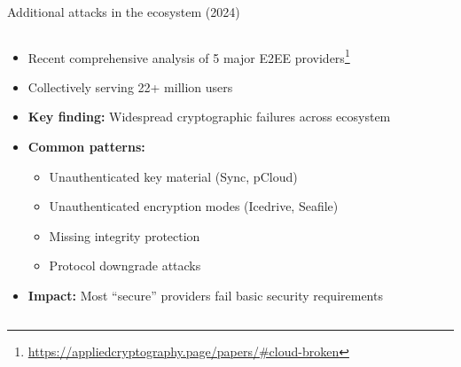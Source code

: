 \documentclass[aspectratio=169, lualatex, handout]{beamer}
\begin{document}
\begin{frame}{Additional attacks in the ecosystem (2024)}
	\begin{columns}[c]
		\begin{column}{1\textwidth}
			\begin{itemize}
				\item Recent comprehensive analysis of 5 major E2EE providers\footnote{\url{https://appliedcryptography.page/papers/\#cloud-broken}}
				\item Collectively serving 22+ million users
				\item \textbf{Key finding:} Widespread cryptographic failures across ecosystem
				\item \textbf{Common patterns:}
				      \begin{itemize}
					      \item Unauthenticated key material (Sync, pCloud)
					      \item Unauthenticated encryption modes (Icedrive, Seafile)
					      \item Missing integrity protection
					      \item Protocol downgrade attacks
				      \end{itemize}
				\item \textbf{Impact:} Most ``secure'' providers fail basic security requirements
			\end{itemize}
		\end{column}
	\end{columns}
\end{frame}
\end{document}
